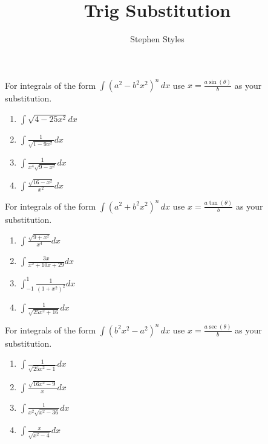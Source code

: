 \documentclass[16pt]{article}
\title{Trig Substitution}
\author{Stephen Styles}
\theoremstyle{remark}
\begin{document}
\maketitle

For integrals of the form $\displaystyle{\int (a^2 -b^2x^2)^n \,dx}$ use $x=\frac{a\sin(\theta)}{b}$ as your substitution.
\begin{enumerate}

\item $\displaystyle{\int \sqrt{4-25x^2} dx}$
\vspace{8cm}

\item $\displaystyle{\int \frac{1}{\sqrt{1-9x^2}} dx}$
\vspace{8cm}

\item $\displaystyle{\int \frac{1}{x^4\sqrt{9-x^2}} dx}$
\vspace{9cm}
\item $\displaystyle{\int \frac{\sqrt{16-x^2}}{x^2} dx}$
\vspace{4cm}
\newpage

\end{enumerate}

For integrals of the form $\displaystyle{\int (a^2 +b^2x^2)^n \,dx}$ use $x=\frac{a\tan(\theta)}{b}$ as your substitution.
\begin{enumerate}


\item $\displaystyle{\int \frac{\sqrt{9+x^2}}{x^4} dx}$
\vspace{8cm}

\item $\displaystyle{\int \frac{3x}{x^2+10x+29} dx}$
\vspace{4cm}
\newpage
\item $\displaystyle{\int_{-1}^{1} \frac{1}{(1+x^2)^2} dx}$
\vspace{8cm}

\item $\displaystyle{\int \frac{1}{\sqrt{25x^2+16}} dx}$
\vspace{4cm}
\newpage
\end{enumerate}
For integrals of the form $\displaystyle{\int (b^2x^2 -a^2)^n \,dx}$ use $x=\frac{a\sec(\theta)}{b}$ as your substitution.
\begin{enumerate}

\item $\displaystyle{\int \frac{1}{\sqrt{25x^2-1}} dx}$
\vspace{9cm}
\item $\displaystyle{\int \frac{\sqrt{16x^2-9}}{x} dx}$
\vspace{4cm}
\newpage
\item $\displaystyle{\int \frac{1}{x^2\sqrt{x^2-36}} dx}$
\vspace{9cm}

\item $\displaystyle{\int \frac{x}{\sqrt{x^2-4}} dx}$
\vspace{4cm}


\end{enumerate}
\end{document}
